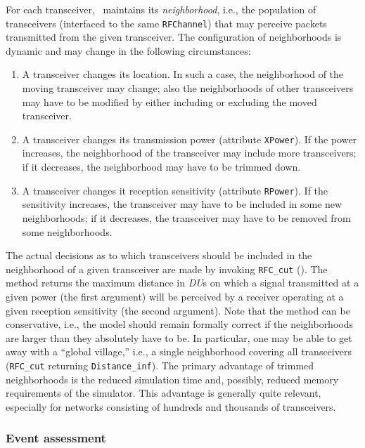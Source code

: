 For each transceiver, \smurph\ maintains its {\em neighborhood}, i.e., the
population of transceivers (interfaced to the same {\tt RFChannel}) that may
perceive packets transmitted from the given transceiver.
The configuration of neighborhoods is dynamic and may change in the following
circumstances:

\begin{enumerate}
\item
A transceiver changes its location.
In such a case, the neighborhood of the moving transceiver may change; also
the neighborhoods of other transceivers may have to be modified by either
including or excluding the moved transceiver.
\item
A transceiver changes its transmission power (attribute {\tt XPower}).
If the power increases, the neighborhood of the transceiver may include more
transceivers; if it decreases, the neighborhood may have to be trimmed down.
\item
A transceiver changes it reception sensitivity (attribute {\tt RPower}).
If the sensitivity increases, the transceiver may have to be included in some
new neighborhoods; if it decreases, the transceiver may have to be removed
from some neighborhoods.
\end{enumerate}

The actual decisions as to which transceivers should be included in the
neighborhood of a given transceiver are made by invoking {\tt RFC\_cut}
().
The method returns the maximum distance in {\em DU\/}s on which a signal
transmitted at a given power (the first argument) will be perceived by
a receiver operating at a given reception sensitivity (the second argument).
Note that the method can be conservative, i.e., the model should remain 
formally correct if the neighborhoods are larger than they absolutely have
to be.
In particular, one may be able to get away with a ``global village,'' i.e.,
a single neighborhood covering all transceivers ({\tt RFC\_cut} returning
{\tt Distance\_inf}).
The primary advantage of trimmed neighborhoods is the reduced simulation time
and, possibly, reduced memory requirements of the simulator.
This advantage is generally quite relevant, especially for networks consisting
of hundreds and thousands of transceivers.

\subsubsection{Event assessment}
\label{rm_tr_ra_ea}

